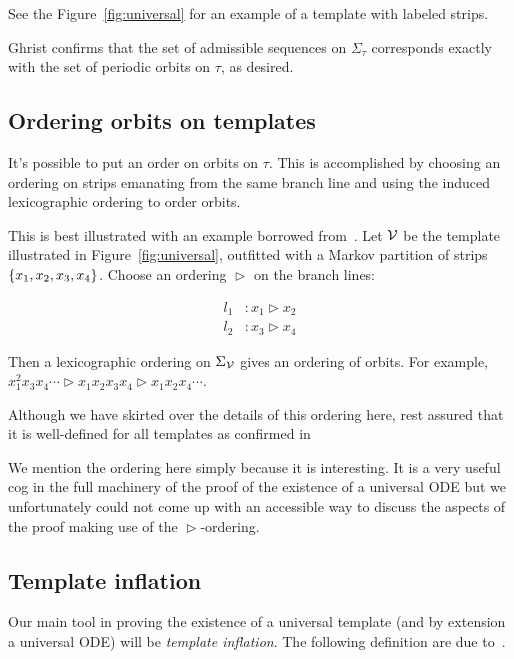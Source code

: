 \documentclass[paper.tex]{subfiles}
\begin{document}
See the Figure~\ref{fig:universal} for an example of a template with labeled strips.

Ghrist confirms that the set of admissible sequences on $\Sigma_\tau$ corresponds exactly with the set of periodic orbits on $\tau$, as desired.


\subsection{Ordering orbits on templates}

It's possible to put an order on orbits on $\tau$. This is accomplished by choosing an ordering on strips emanating from the same branch line and using the induced lexicographic ordering to
order orbits.

This is best illustrated with an example borrowed from~\cite{knottyode}. Let $\mathcal{V}$ be the template illustrated in Figure~\ref{fig:universal}, outfitted with a Markov partition of strips $\{ x_1, x_2, x_3, x_4 \}$.
Choose an ordering $\vartriangleright$ on the branch lines:

\begin{align}
  l_1 &: x_1 \vartriangleright x_2 \\
  l_2 &: x_3 \vartriangleright x_4
\end{align}

Then a lexicographic ordering on $\Sigma_{\mathcal{V}}$ gives an ordering of orbits. For example, $x_1^2 x_3 x_4 \cdots \vartriangleright x_1 x_2 x_3 x_4 \vartriangleright x_1 x_2 x_4 \cdots$.

Although we have skirted over the details of this ordering here, rest assured that it is well-defined for all templates as confirmed in~\cite{Holmes1989}\cite{Holmes1985}\cite{knottyode}

We mention the ordering here simply because it is interesting. It is a very useful cog in the full machinery of the proof of the existence of a universal ODE but we unfortunately could not come up with an accessible
way to discuss the aspects of the proof making use of the $\vartriangleright$-ordering.


\subsection{Template inflation}

Our main tool in proving the existence of a universal template (and by extension a universal ODE) will be \emph{template inflation}. The following definition are due to~\cite{knottyode}.
\end{document}
